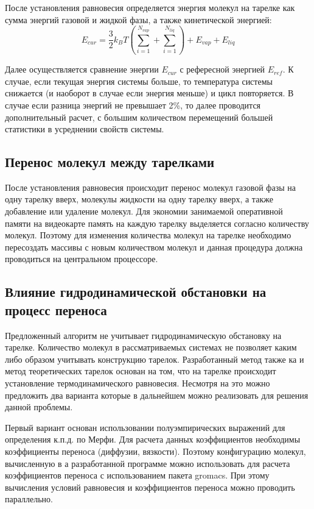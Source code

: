 После установления равновесия определяется энергия молекул на тарелке как сумма энергий газовой и жидкой фазы, а также кинетической энергией:
\begin{equation} \label{eq:curen}
E_{cur} = \dfrac{3}{2} k_B T (\sum_{i=1}^{N_{vap}} + \sum_{i=1}^{N_{liq}}) + E_{vap} + E_{liq}
\end{equation}

Далее осуществляется сравнение энергии $E_{cur}$  с рефересной энергией $E_{ref}$. К случае, если текущая энергия системы больше, то температура системы снижается (и наоборот в случае если энергия меньше) и цикл повторяется. В случае если разница энергий не превышает 2\%, то далее проводится дополнительный расчет, с большим количеством перемещений большей статистики в усреднении свойств системы.

\subsection{Перенос молекул между тарелками}

После установления равновесия происходит перенос молекул газовой фазы на одну тарелку вверх, молекулы жидкости на одну тарелку вверх, а также добавление или удаление молекул. Для экономии занимаемой оперативной памяти на видеокарте память на каждую тарелку выделяется согласно количеству молекул. Поэтому для изменения количества молекул на тарелке необходимо пересоздать массивы с новым количеством молекул и данная процедура должна проводиться на центральном процессоре.


\subsection{Влияние гидродинамической обстановки на процесс переноса}

Предложенный алгоритм не учитывает гидродинамическую обстановку на тарелке. Количество молекул в рассматриваемых системах не позволяет каким либо образом учитывать конструкцию тарелок. Разработанный метод также ка и метод теоретических тарелок основан на том, что на тарелке происходит установление термодинамического равновесия. Несмотря на это можно предложить два варианта которые в дальнейшем можно реализовать для решения данной проблемы.

Первый вариант основан использовании полуэмпирических выражений для определения к.п.д. по Мерфи. Для расчета данных коэффициентов необходимы коэффициенты переноса (диффузии, вязкости). Поэтому конфигурацию молекул, вычисленную в а разработанной программе можно использовать для расчета коэффициентов переноса с использованием пакета gromacs. При этому вычисления условий равновесия и коэффициентов переноса можно проводить параллельно.

